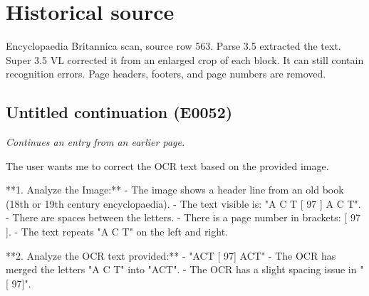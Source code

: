 \documentclass{article}
\begin{document}
\section*{Historical source}
Encyclopaedia Britannica scan, source row 563. Parse 3.5 extracted the text. Super 3.5 VL corrected it from an enlarged crop of each block. It can still contain recognition errors.
Page headers, footers, and page numbers are removed.

\subsection*{Untitled continuation (E0052)}
\textit{Continues an entry from an earlier page.}

The user wants me to correct the OCR text based on the provided image.

**1. Analyze the Image:**
- The image shows a header line from an old book (18th or 19th century encyclopaedia).
- The text visible is: "A C T [ 97 ] A C T".
- There are spaces between the letters.
- There is a page number in brackets: [ 97 ].
- The text repeats "A C T" on the left and right.

**2. Analyze the OCR text provided:**
- "ACT [ 97] ACT"
- The OCR has merged the letters "A C T" into "ACT".
- The OCR has a slight spacing issue in "[ 97]".
\end{document}
